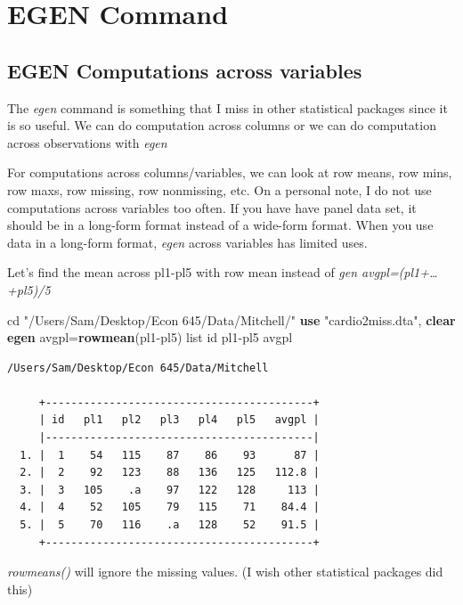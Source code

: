 \documentclass[
]{book}
\newenvironment{Shaded}{\begin{snugshade}}{\end{snugshade}}
\newcommand{\FunctionTok}[1]{\textcolor[rgb]{0.13,0.29,0.53}{\textbf{#1}}}
\newcommand{\KeywordTok}[1]{\textcolor[rgb]{0.13,0.29,0.53}{\textbf{#1}}}
\newcommand{\NormalTok}[1]{#1}
\newcommand{\OtherTok}[1]{\textcolor[rgb]{0.56,0.35,0.01}{#1}}
\newcommand{\StringTok}[1]{\textcolor[rgb]{0.31,0.60,0.02}{#1}}
\begin{document}
\chapter{EGEN Command}\label{egen-command}

\section{EGEN Computations across variables}\label{egen-computations-across-variables}

The \emph{egen} command is something that I miss in other statistical packages since it is so useful. We can do computation across columns or we can do computation across observations with \emph{egen}

For computations across columns/variables, we can look at row means, row mins, row maxs, row missing, row nonmissing, etc. On a personal note, I do not use computations across variables too often. If you have have panel data set, it should be in a long-form format instead of a wide-form format. When you use data in a long-form format, \emph{egen} across variables has limited uses.

Let's find the mean across pl1-pl5 with row mean instead of \emph{gen avgpl=(pl1+\ldots+pl5)/5}

\begin{Shaded}
\begin{Highlighting}[]
\NormalTok{cd }\StringTok{"/Users/Sam/Desktop/Econ 645/Data/Mitchell/"}
\KeywordTok{use} \StringTok{"cardio2miss.dta"}\NormalTok{, }\KeywordTok{clear}
\KeywordTok{egen}\NormalTok{ avgpl=}\FunctionTok{rowmean}\NormalTok{(pl1{-}pl5)}
\OtherTok{list}\NormalTok{ id pl1{-}pl5 avgpl}
\end{Highlighting}
\end{Shaded}

\begin{verbatim}
/Users/Sam/Desktop/Econ 645/Data/Mitchell

     +------------------------------------------+
     | id   pl1   pl2   pl3   pl4   pl5   avgpl |
     |------------------------------------------|
  1. |  1    54   115    87    86    93      87 |
  2. |  2    92   123    88   136   125   112.8 |
  3. |  3   105    .a    97   122   128     113 |
  4. |  4    52   105    79   115    71    84.4 |
  5. |  5    70   116    .a   128    52    91.5 |
     +------------------------------------------+
\end{verbatim}

\emph{rowmeans()} will ignore the missing values. (I wish other statistical packages did this)
\end{document}
